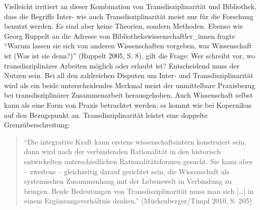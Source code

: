 Vielleicht irritiert an dieser Kombination von Transdisziplinarität und
Bibliothek, dass die Begriffe Inter- wie auch Transdisziplinarität meist
nur für die Forschung benutzt werden. Es sind aber keine Theorien,
sondern Methoden. Ebenso wie Georg Ruppelt an die Adresse von
Bibliothekswissenschaftler\_innen fragte \enquote{Warum lassen sie sich
von anderen Wissenschaften vorgeben, was Wissenschaft ist (Was ist sie
denn?)} (Ruppelt 2005, S. 8), gilt die Frage: Wer schreibt vor, wo
transdisziplinäres Arbeiten möglich oder erlaubt ist? Entscheidend muss
der Nutzen sein. Bei all den zahlreichen Disputen um Inter- und
Transdisziplinarität wird als ein beide unterscheidendes Merkmal meist
der unmittelbare Praxisbezug bei transdisziplinärer Zusammenarbeit
herausgehoben. Auch Wissenschaft selbst kann als eine Form von Praxis
betrachtet werden; es kommt wie bei Kopernikus auf den Bezugspunkt an.
Transdisziplinarität leistet eine doppelte Grenzüberschreitung:

\begin{quote}
\enquote{Die integrative Kraft kann erstens wissenschaftsintern
konstruiert sein, dann wird nach der verbindenden Rationalität in den
historisch entwickelten unterschiedlichen Rationalitätsformen gesucht.
Sie kann aber -- zweitens -- gleichzeitig darauf gerichtet sein, die
Wissenschaft als systemischen Zusammenhang mit der Lebenswelt in
Verbindung zu bringen. Beide Bedeutungen von Transdisziplinarität muss
man sich {[}\ldots{}{]} in einem Ergänzungsverhältnis denken.}
(Mückenberger/Timpf 2010, S. 205)
\end{quote}

